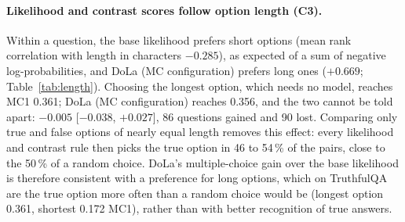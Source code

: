 \documentclass[11pt]{article}
\newcommand{\cha}[1]{\textsf{C#1}}
\begin{document}
\begin{table}[t]
\centering\small\setlength{\tabcolsep}{4pt}
\caption{Held-out questions grouped by the number of option tokens the plausibility constraint masks under DoLa's
generation settings: the true MC1 option against the false option with the fewest masked tokens. MC1 per group for
three rules.}
\label{tab:masking}
\end{table}

\paragraph{Likelihood and contrast scores follow option length (\cha3).}
Within a question, the base likelihood prefers short options (mean rank correlation with length in characters
$-0.285$), as expected of a sum of negative log-probabilities, and DoLa (MC configuration) prefers long ones
($+0.669$; Table~\ref{tab:length}). Choosing the
longest option, which needs no model, reaches MC1 0.361; DoLa (MC configuration) reaches 0.356, and the two cannot
be told apart: $-0.005$ [$-0.038$, $+0.027$], 86 questions gained and 90 lost. Comparing only true and false options
of nearly equal length removes this effect: every likelihood and contrast rule then picks the true option in 46 to
54\,\% of the pairs, close to the 50\,\% of a random choice. DoLa's multiple-choice gain over the base likelihood is
therefore consistent with a preference for long options, which on TruthfulQA are the true option more often than a
random choice would be (longest option 0.361, shortest 0.172 MC1), rather than with better recognition of true
answers.

\begin{table}[t]
\centering\small\setlength{\tabcolsep}{3.5pt}
\caption{Option length and option scores on the 767 held-out questions. Length correlation: mean within-question
Spearman correlation between the option score and its length in characters (second option set). Matched pairs:
length-matched pairwise accuracy, the share of true--false option pairs whose token counts differ by at most one in
which the true option scores higher (654 questions have such pairs). Picks longest: share of questions in which the
rule's MC1 choice is the longest option by token count. The token-count baseline loses on ties, which MC1 counts as wrong.}
\label{tab:length}
\end{table}
\end{document}

